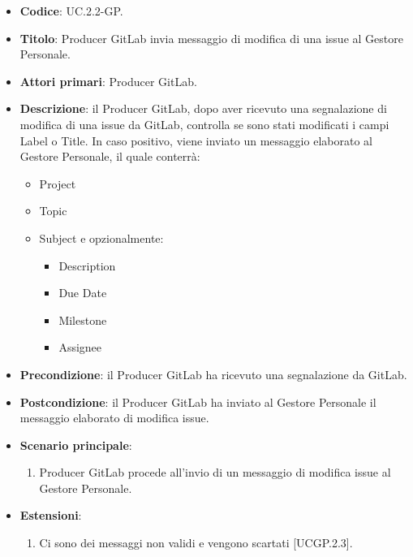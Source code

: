 		\begin{itemize}
			\item \textbf{Codice}: UC\theuccount.2.2-GP.
			\item \textbf{Titolo}: Producer GitLab invia messaggio di modifica di una issue al Gestore Personale.
			\item \textbf{Attori primari}: Producer GitLab.
			\item \textbf{Descrizione}: il Producer GitLab, dopo aver ricevuto una segnalazione di modifica di una issue da GitLab, controlla se sono stati modificati i campi Label o Title.
			In caso positivo, viene inviato un messaggio elaborato al Gestore Personale, il quale conterrà:
			\begin{itemize}
				\item Project
				\item Topic
				\item Subject e opzionalmente:
				\begin{itemize}
					\item Description
					\item Due Date
					\item Milestone
					\item Assignee
				\end{itemize}
			\end{itemize}
			\item \textbf{Precondizione}: il Producer GitLab ha ricevuto una segnalazione da GitLab.
			\item \textbf{Postcondizione}: il Producer GitLab ha inviato al Gestore Personale il messaggio elaborato di modifica issue.
			\item \textbf{Scenario principale}: 
			\begin{enumerate}
				\item Producer GitLab procede all'invio di un messaggio di modifica issue al Gestore Personale.
			\end{enumerate}
			\item \textbf{Estensioni}: 
			\begin{enumerate}
				\item Ci sono dei messaggi non validi e vengono scartati [UCGP\theuccount.2.3].
			\end{enumerate}
		\end{itemize}
	
